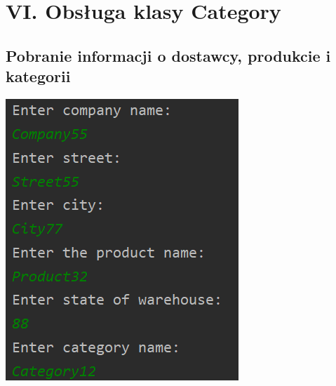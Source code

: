 \documentclass[a4paper, 11pt]{article}
\begin{document}
    \newpage



    \section{VI. Obsługa klasy Category}

    \subsection{Pobranie informacji o dostawcy, produkcie i kategorii}
    \begin{center}
        \includegraphics[scale=1.3]{images/point6/addSupplierProductAndCategory.png}
    \end{center}
\end{document}
